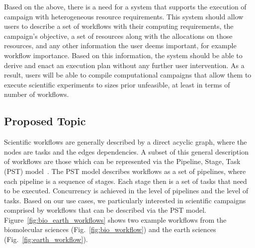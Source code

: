 Based on the above, there is a need for a system that supports the execution of campaign with heterogeneous resource requirements.
This system should allow users to describe a set of workflows with their computing requirements, the campaign's objective, a set of resources along with the allocations on those resources, and any other information the user deems important, for example workflow importance.
Based on this information, the system should be able to derive and enact an execution plan without any further user intervention.
As a result, users will be able to compile computational campaigns that allow them to execute scientific experiments to sizes prior unfeasible, at least in terms of number of workflows.


\subsection{Proposed Topic}

Scientific workflows are generally described by a direct acyclic graph, where the nodes are tasks and the edges dependencies.
A subset of this general description of workflows are those which can be represented via the Pipeline, Stage, Task (PST) model~\cite{balasubramanian2018harnessing}.
The PST model describes workflows as a set of pipelines, where each pipeline is a sequence of stages.
Each stage then is a set of tasks that need to be executed.
Concurrency is achieved in the level of pipelines and the level of tasks. 
Based on our use cases, we particularly interested in scientific campaigns comprised by workflows that can be described via the PST model.
Figure~\ref{fig:bio_earth_workflows} shows two example workflows from the biomolecular sciences (Fig.~\ref{fig:bio_workflow}) and the earth sciences (Fig.~\ref{fig:earth_workflow}). 


